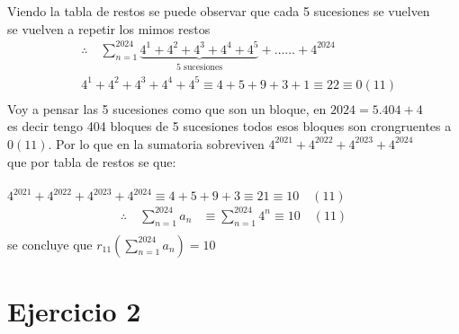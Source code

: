 \documentclass[a4paper]{article}
\begin{document}
Viendo la tabla de restos se puede observar que cada 5 sucesiones se vuelven \\
se vuelven a repetir los mimos restos\\
\begin{align*}
&\therefore \quad \sum_{n=1}^{2024} \underbrace{4^1 + 4^2 + 4^3 + 4^4 + 4^5}_{\text{5 sucesiones}}  + \ldots \ldots  
+ 4^{2024} \\ 
&4^1 + 4^2 + 4^3 + 4^4 + 4^5 \equiv 4 + 5 + 9 + 3 + 1 \equiv 22 \equiv 0 (11) \\
\end{align*}
Voy a pensar las 5 sucesiones como que son un bloque, en $2024 = 5.404 + 4$ \\
es decir tengo 404 bloques de 5 sucesiones todos esos bloques son crongruentes a $0 (11)$.
Por lo que en la sumatoria sobreviven $4^{2021} + 4^{2022} + 4^{2023} + 4^{2024}$ \\
que por tabla de restos se que: \\ \\ $4^{2021} + 4^{2022} + 4^{2023} + 4^{2024} \equiv 4 + 5
+ 9 + 3 \equiv 21 \equiv 10 \quad (11)$ \\
\begin{align*}
\therefore \quad \sum_{n=1}^{2024} a_n &\equiv \sum_{n=1}^{2024} 4^n \equiv 10 \quad (11) \\ 
\end{align*}
se concluye que  $r_{11}(\sum_{n=1}^{2024} a_n) = 10$

\section{Ejercicio 2}
\end{document}
